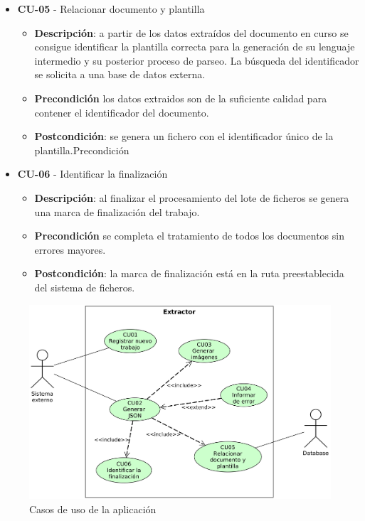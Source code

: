 \begin{itemize}
\item \textbf{CU-05} - Relacionar documento y plantilla
	\begin{itemize}
		\item \textbf{Descripción}: a partir de los datos extraídos del documento en curso se consigue identificar la plantilla correcta para la generación de su lenguaje intermedio y su posterior proceso de parseo. La búsqueda del identificador se solicita a una base de datos externa.
		\item \textbf{Precondición} los datos extraidos son de la suficiente calidad para contener el identificador del documento.
		\item \textbf{Postcondición}: se genera un fichero con el identificador único de la plantilla.Precondición
\end{itemize}
\item \textbf{CU-06} - Identificar la finalización
	\begin{itemize}
		\item \textbf{Descripción}: al finalizar el procesamiento del lote de ficheros se genera una marca de finalización del trabajo.
		\item \textbf{Precondición} se completa el tratamiento de todos los documentos sin errores mayores.
		\item \textbf{Postcondición}: la marca de finalización está en la ruta preestablecida del sistema de ficheros.
\end{itemize}

\end{itemize}

\begin{figure}[hp!]
	\centering
	\includegraphics[width=1.0\textwidth]{imaxes/g-analisis/casos-uso.png}
	\caption{Casos de uso de la aplicación}
	\label{fig:casos-de-uso}
\end{figure}

